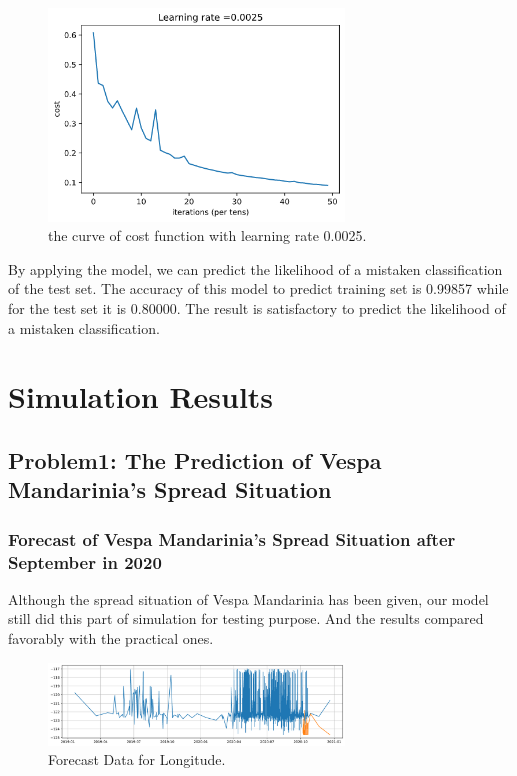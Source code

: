 \documentclass{mcmthesis}
\begin{document}
\begin{figure}[!htbp]
	\centering
 	\includegraphics[width = 0.7\textwidth]{costFunction.png} 
	\caption{the curve of cost function with learning rate 0.0025.}
	\label{fig:COSTFUNCTION}
\end{figure}

 By applying the model, we can predict the likelihood of a mistaken classification of the test set. The accuracy of this model to predict training set is 0.99857 while for the test set it is 0.80000. The result is satisfactory to predict the likelihood of a mistaken classification.



\section{Simulation Results}
\subsection{Problem1: The Prediction of Vespa Mandarinia's Spread Situation}
\subsubsection{Forecast of Vespa Mandarinia's Spread Situation after September in 2020 }
Although the spread situation of Vespa Mandarinia has been given, our model still did this part of simulation for testing purpose. And the results compared favorably with the practical ones.
\begin{figure}[!htbp]
	\centering
 	\includegraphics[width = 0.7\textwidth]{Longitude.png} 
	\caption{Forecast Data for Longitude.}
	\label{fig:long}
\end{figure}
\end{document}
